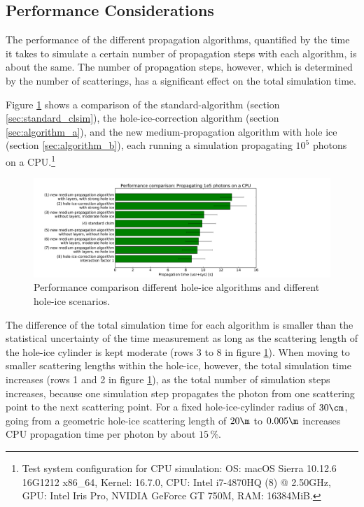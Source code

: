 
\subsection{Performance Considerations}
\label{sec:performance}

The performance of the different propagation algorithms, quantified by the time it takes to simulate a certain number of propagation steps with each algorithm, is about the same. The number of propagation steps, however, which is determined by the number of scatterings, has a significant effect on the total simulation time.

Figure \ref{fig:Go7Maquo} shows a comparison of the standard-\clsim algorithm (section \ref{sec:standard_clsim}), the hole-ice-correction algorithm (section \ref{sec:algorithm_a}), and the new medium-propagation algorithm with hole ice (section \ref{sec:algorithm_b}), each running a simulation propagating $10^5$ photons on a CPU.\footnote{Test system configuration for CPU simulation: OS: macOS Sierra 10.12.6 16G1212 x86\_64, Kernel: 16.7.0, CPU: Intel i7-4870HQ (8) @ 2.50GHz, GPU: Intel Iris Pro, NVIDIA GeForce GT 750M, RAM: 16384MiB.}

\begin{figure}[htbp]
  \includegraphics[width=\textwidth, trim = {1cm 0 10cm 0.7cm}, clip]{img/performance-comparison}
  \caption{Performance comparison different hole-ice algorithms and different hole-ice scenarios.}
  \label{fig:Go7Maquo}
\end{figure}


The difference of the total simulation time for each algorithm is smaller than the statistical uncertainty of the time measurement as long as the scattering length of the hole-ice cylinder is kept moderate (rows 3 to 8 in figure \ref{fig:Go7Maquo}). When moving to smaller scattering lengths within the hole-ice, however, the total simulation time increases (rows 1 and 2 in figure \ref{fig:Go7Maquo}), as the total number of simulation steps increases, because one simulation step propagates the photon from one scattering point to the next scattering point.
For a fixed hole-ice-cylinder radius of $30\cm$, going from a geometric hole-ice scattering length of $20\m$ to $0.005\m$ increases CPU propagation time per photon by about $15\,\%$.

